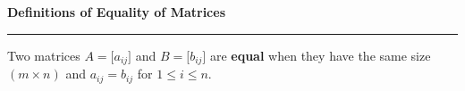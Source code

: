 \nopagenumbers
{\bf Definitions of Equality of Matrices}
\vskip 1mm
\hrule

\vskip 6pt
Two matrices $A=\lbrack a_{ij}\rbrack$ and $B=\lbrack b_{ij}\rbrack$ are {\bf equal} when they have the same size $(m\times n)$ and $a_{ij}=b_{ij}$ for $1\leq i \leq n$.


\vfill\eject
\bye
